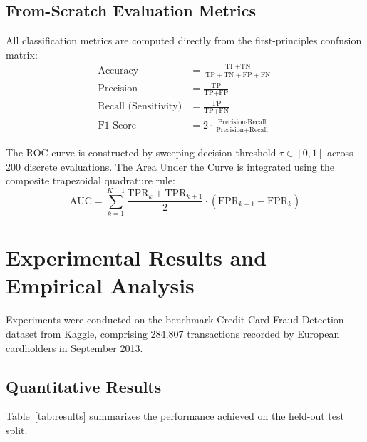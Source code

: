 \documentclass[11pt,a4paper]{article}
\begin{document}
\subsection{From-Scratch Evaluation Metrics}
All classification metrics are computed directly from the first-principles confusion matrix:
\begin{align}
    \text{Accuracy} &= \frac{\text{TP} + \text{TN}}{\text{TP} + \text{TN} + \text{FP} + \text{FN}} \\
    \text{Precision} &= \frac{\text{TP}}{\text{TP} + \text{FP}} \\
    \text{Recall (Sensitivity)} &= \frac{\text{TP}}{\text{TP} + \text{FN}} \\
    \text{F1-Score} &= 2 \cdot \frac{\text{Precision} \cdot \text{Recall}}{\text{Precision} + \text{Recall}}
\end{align}

The ROC curve is constructed by sweeping decision threshold $\tau \in [0, 1]$ across 200 discrete evaluations. The Area Under the Curve is integrated using the composite trapezoidal quadrature rule:
\begin{equation}
    \text{AUC} = \sum_{k=1}^{K-1} \frac{\text{TPR}_k + \text{TPR}_{k+1}}{2} \cdot (\text{FPR}_{k+1} - \text{FPR}_k)
\end{equation}

\section{Experimental Results and Empirical Analysis}
\label{sec:results}

Experiments were conducted on the benchmark Credit Card Fraud Detection dataset from Kaggle, comprising 284,807 transactions recorded by European cardholders in September 2013.

\subsection{Quantitative Results}
Table~\ref{tab:results} summarizes the performance achieved on the held-out test split.
\end{document}
